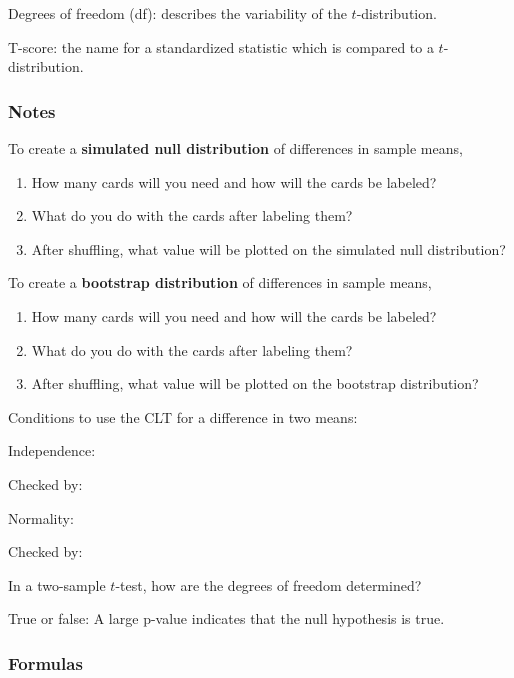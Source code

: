 \documentclass[
]{report}
\newcommand{\rgs}{\vspace{12pt}} %
\newcommand{\rgi}{\hspace{24pt}}  %
\begin{document}
Degrees of freedom (df): describes the variability of the \(t\)-distribution.

T-score: the name for a standardized statistic which is compared to a \(t\)-distribution.

\hypertarget{notes-26}{%
\subsubsection*{Notes}\label{notes-26}}

To create a \textbf{simulated null distribution} of differences in sample means,

\begin{enumerate}
\def\labelenumi{\arabic{enumi}.}
\item
  How many cards will you need and how will the cards be labeled?
  \rgs
\item
  What do you do with the cards after labeling them?
  \rgs
\item
  After shuffling, what value will be plotted on the simulated null distribution?
  \rgs
\end{enumerate}

To create a \textbf{bootstrap distribution} of differences in sample means,

\begin{enumerate}
\def\labelenumi{\arabic{enumi}.}
\item
  How many cards will you need and how will the cards be labeled?
  \rgs
\item
  What do you do with the cards after labeling them?
  \rgs
\item
  After shuffling, what value will be plotted on the bootstrap distribution?
  \rgs
\end{enumerate}

Conditions to use the CLT for a difference in two means:

\rgi Independence:
\rgs

\rgi \rgi Checked by:
\rgs

\rgi Normality:
\rgs

\rgi \rgi Checked by:
\rgs

In a two-sample \(t\)-test, how are the degrees of freedom determined?
\rgs        

True or false: A large p-value indicates that the null hypothesis is true.
\rgs

\hypertarget{formulas-10}{%
\subsubsection*{Formulas}\label{formulas-10}}
\end{document}
